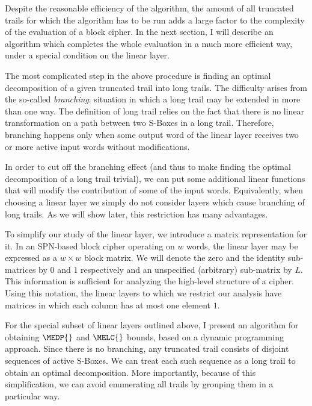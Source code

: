 Despite the reasonable efficiency of the algorithm, the amount of all truncated trails for which the algorithm has to be run adds a large factor to the complexity of the evaluation of a block cipher. In the next section, I will describe an algorithm which completes the whole evaluation in a much more efficient way, under a special condition on the linear layer.



The most complicated step in the above procedure is finding an optimal decomposition of a given truncated trail into long trails. The difficulty arises from the so-called \emph{branching}: situation in which a long trail may be extended in more than one way. The definition of long trail relies on the fact that there is no linear transformation on a path between two S-Boxes in a long trail. Therefore, branching happens only when some output word of the linear layer receives two or more active input words without modifications. 

In order to cut off the branching effect (and thus to make finding the optimal decomposition of a long trail trivial), we can put some additional linear functions that will modify the contribution of some of the input words. Equivalently, when choosing a linear layer we simply do not consider layers which cause branching of long trails. As we will show later, this restriction has many advantages. 

To simplify our study of the linear layer, we introduce a matrix representation for it. In an SPN-based block cipher operating on $w$ words, the linear layer may be expressed as a $w\times w$ block matrix. We will denote the zero and the identity sub-matrices by $0$ and $1$ respectively and an unspecified (arbitrary) sub-matrix by $L$. This information is sufficient for analyzing the high-level structure of a cipher. Using this notation, the linear layers to which we restrict our analysis have matrices in which each column has at most one element $1$.

For the special subset of linear layers outlined above, I present an algorithm for obtaining $\MEDP{}$ and $\MELC{}$ bounds, based on a dynamic programming approach. Since there is no branching, any truncated trail consists of disjoint sequences of active S-Boxes. We can treat each such sequence as a long trail to obtain an optimal decomposition. More importantly, because of this simplification, we can avoid enumerating all trails by grouping them in a particular way.

